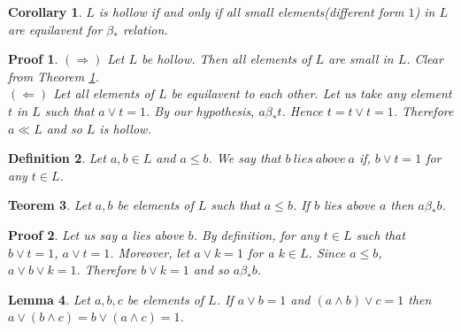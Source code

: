\documentclass[a4paper,12pt]{article}
\numberwithin{equation}{section}
\theoremstyle{italik}
\newtheorem{teorem}{Teorem}[section]
\newtheorem{lemma}[teorem]{Lemma}
\newtheorem{sonuc}[teorem]{Corollary}
\newtheorem{tanim}[teorem]{Definition}
\newtheorem*{ispat}{Proof}
\begin{document}
\begin{sonuc} \label{5}
  $ L $ is hollow if and only if all small elements(different form $ 1 $) in $ L $ are equilavent for $ \beta_* $ relation. 
\end{sonuc}
\begin{ispat}
  $ ( \Rightarrow ) $
  Let $ L $ be hollow. Then all elements of $ L $ are small in $ L $. Clear from Theorem \ref{5}. \\
  $ ( \Leftarrow ) $ 
  Let all elements of $ L $ be equilavent to each other. Let us take any element $ t $ in $ L $ 
  such that $ a \vee t = 1 $. By our hypothesis, $ a \beta_* t $. Hence $ t = t \vee t = 1 $. 
  Therefore $ a \ll L $ and so $ L $ is hollow. 
\end{ispat}
\begin{tanim}
  Let $ a, b \in L $ and $ a \leq b $. We say that $ b\  lies\  above\  a $ if, 
  $ b \vee t = 1 $ for any $ t \in L $.
\end{tanim}
\begin{teorem}\label{6}
  Let $ a,b $ be elements of $ L $ such that $ a \leq b $. 
  If $ b $ lies above $ a $ then $ a \beta_* b $. 
\end{teorem}
\begin{ispat}
  Let us say $ a $ lies above $ b $. By definition, for any $ t \in L $ such that $ b \vee t = 1 $, 
  $ a \vee t = 1 $. Moreover, let $ a \vee k = 1 $ for a $ k \in L $. 
  Since $ a \leq b $, $ a \vee b \vee k = 1 $. Therefore $ b \vee k = 1 $ and so $ a \beta_* b $.

\end{ispat}
\begin{lemma}\label{7}
  Let $ a,b,c $ be elements of $ L $.
  If $ a \vee b = 1 $ and $ ( a \wedge b ) \vee c =1 $
  then $ a \vee(b \wedge c)=b \vee ( a \wedge c ) = 1 $.
\end{lemma}
\end{document}

